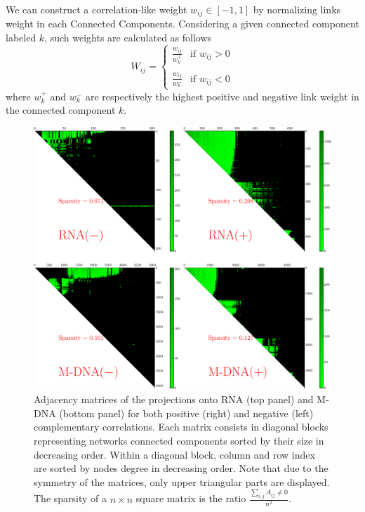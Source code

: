 \documentclass[10pt,a4paper]{article}
\begin{document}
We can construct a correlation-like weight $w_{ij} \in [-1,1]$ by normalizing links weight in each Connected Components. Considering a given connected component labeled $k$, such weights are calculated as follows
\begin{equation}
W_{ij} = \left\{\begin{matrix}
\frac{w_{ij}}{w_{k}^{+}} & \mbox{if $w_{ij} > 0$}\\
&\\
\frac{w_{ij}}{w_{k}^{-}} & \mbox{if $w_{ij} < 0$}
\end{matrix}\right.
\end{equation}
where $w_ {k}^{+}$ and $w_ {k}^{-}$ are respectively the highest positive and negative link weight in the connected component $k$.
\begin{figure}[h!]
\centering
\includegraphics[scale=0.4]{clustered-matrices.pdf}
\caption{\label{fig:mat}Adjacency matrices of the projections onto RNA (top panel) and M-DNA (bottom panel) for both positive (right) and negative (left) complementary correlations. Each matrix consists in diagonal blocks representing networks connected components sorted by their size in decreasing order. Within a diagonal block, column and row index are sorted by nodes degree in decreasing order. Note that due to the symmetry of the matrices, only upper triangular parts are displayed. The sparsity of a $n\times n$ square matrix is the ratio $\frac{\sum_{i,j}A_{ij}\neq 0}{n^{2}}$.}
\end{figure}
\end{document}
